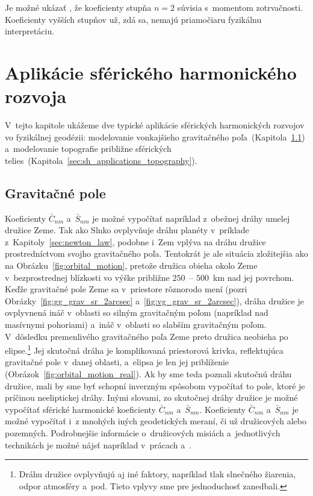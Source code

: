 \documentclass[a4paper, 12pt]{book}
\begin{document}
Je možné ukázať \parencite[napríklad][]{MoritzPhysicalGeodesy}, že koeficienty
stupňa $n = 2$ súvisia s~momentom zotrvačnosti.  Koeficienty vyšších stupňov
už, zdá sa, nemajú priamočiaru fyzikálnu interpretáciu.







\section{Aplikácie sférického harmonického rozvoja}
\label{sec:spherical_harmonics_applications}

V~tejto kapitole ukážeme dve typické aplikácie sférických harmonických rozvojov 
vo fyzikálnej geodézii: modelovanie vonkajšieho gravitačného 
poľa~(Kapitola~\ref{sec:sh_applications_gravity_field})
a~modelovanie topografie približne sférických 
telies~(Kapitola~\ref{sec:sh_applications_topography}).

\subsection{Gravitačné pole}
\label{sec:sh_applications_gravity_field}

Koeficienty $\bar{C}_{nm}$ a~$\bar{S}_{nm}$ je možné vypočítať napríklad
z~obežnej dráhy umelej družice Zeme.  Tak ako Slnko ovplyvňuje dráhu planéty
v~príklade z~Kapitoly~\ref{sec:newton_law}, podobne i~Zem vplýva na dráhu
družice prostredníctvom svojho gravitačného poľa.  Tentokrát je ale situácia
zložitejšia ako na Obrázku~\ref{fig:orbital_motion}, pretože družica obieha
okolo Zeme v~bezprostrednej blízkosti vo výške približne $250$~-- $500$~km nad
jej povrchom.  Keďže gravitačné pole Zeme sa v~priestore rôznorodo mení (pozri
Obrázky~\ref{fig:gg_grav_sr_2arcsec} a~\ref{fig:vg_grav_sr_2arcsec}), dráha
družice je ovplyvnená ináč v~oblasti so silným gravitačným poľom (napríklad nad
masívnymi pohoriami) a~ináč v~oblasti so slabším gravitačným poľom.  V~dôsledku
premenlivého gravitačného poľa Zeme preto družica neobieha po
elipse.\footnote{Dráhu družice ovplyvňujú aj iné faktory, napríklad tlak
slnečného žiarenia, odpor atmosféry a~pod.  Tieto vplyvy sme pre jednoduchosť
zanedbali.}  Jej skutočná dráha je komplikovaná priestorová krivka,
reflektujúca gravitačné pole v~danej oblasti, a~elipsa je len jej priblíženie
(Obrázok~\ref{fig:orbital_motion_real}).  Ak by sme teda poznali skutočnú dráhu
družice, mali by sme byť schopní inverzným spôsobom vypočítať to pole, ktoré je
príčinou neeliptickej dráhy.  Inými slovami, zo skutočnej dráhy družice je
možné vypočítať sférické harmonické koeficienty $\bar{C}_{nm}$
a~$\bar{S}_{nm}$.  Koeficienty $\bar{C}_{nm}$ a~$\bar{S}_{nm}$ je možné
vypočítať i~z mnohých iných geodetických meraní, či už družicových alebo
pozemných.  Podrobnejšie informácie o~družicových misiách a~jednotlivých
technikách je možné nájsť napríklad v~prácach \textcite{SeeberSatelliteGeodesy}
a~\textcite{MoritzPhysicalGeodesy}.
\end{document}
